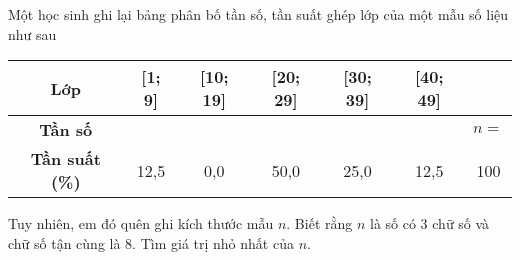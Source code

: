 \begin{bt}%
Một học sinh ghi lại bảng phân bố tần số, tần suất ghép lớp của một mẫu số liệu như sau
\begin{center}
\begin{tabular}{|c|c|c|c|c|c|c|}
\hline
\bf Lớp  & [1; 9] & [10; 19] & [20; 29] & [30; 39] & [40; 49] & \\
\hline
\bf Tần số & & & & & & $n =$\\
\hline
\bf Tần suất (\%) & 12,5 & 0,0 & 50,0 & 25,0 & 12,5 & 100\\
\hline
\end{tabular}
\end{center}
Tuy nhiên, em đó quên ghi kích thước mẫu $n$. Biết rằng $n$ là số có 3 chữ số và chữ số tận cùng là 8. Tìm giá trị nhỏ nhất của $n$.

\end{bt}

